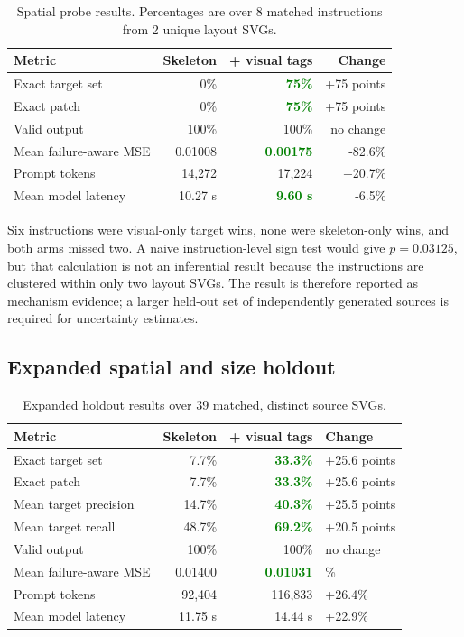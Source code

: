 \documentclass[10pt,a4paper]{article}
\newcommand{\good}[1]{\textcolor{green}{\textbf{#1}}}
\begin{document}
\begin{table}[H]
\centering
\caption{Spatial probe results. Percentages are over 8 matched instructions
from 2 unique layout SVGs.}
\begin{tabular}{@{}lR@{\hspace{4mm}}R@{\hspace{4mm}}R@{}}
\toprule
\textbf{Metric} & \textbf{Skeleton} & \textbf{+ visual tags} & \textbf{Change}\\
\midrule
Exact target set & 0\% & \good{75\%} & +75 points\\
Exact patch & 0\% & \good{75\%} & +75 points\\
Valid output & 100\% & 100\% & no change\\
Mean failure-aware MSE & 0.01008 & \good{0.00175} & -82.6\%\\
Prompt tokens & 14,272 & 17,224 & +20.7\%\\
Mean model latency & 10.27 s & \good{9.60 s} & -6.5\%\\
\bottomrule
\end{tabular}
\end{table}

Six instructions were visual-only target wins, none were skeleton-only wins,
and both arms missed two. A naive instruction-level sign test would give
\(p=0.03125\), but that calculation is not an inferential result because the
instructions are clustered within only two layout SVGs. The result is therefore
reported as mechanism evidence; a larger held-out set of independently
generated sources is required for uncertainty estimates.

\subsection{Expanded spatial and size holdout}

\begin{table}[H]
\centering
\caption{Expanded holdout results over 39 matched, distinct source SVGs.}
\begin{tabular}{@{}lrr>{\raggedleft\arraybackslash}p{24mm}@{}}
\toprule
\textbf{Metric} & \textbf{Skeleton} & \textbf{+ visual tags} & \textbf{Change}\\
\midrule
Exact target set & 7.7\% & \good{33.3\%} & +25.6 points\\
Exact patch & 7.7\% & \good{33.3\%} & +25.6 points\\
Mean target precision & 14.7\% & \good{40.3\%} & +25.5 points\\
Mean target recall & 48.7\% & \good{69.2\%} & +20.5 points\\
Valid output & 100\% & 100\% & no change\\
Mean failure-aware MSE & 0.01400 & \good{0.01031} & -26.4\%\\
Prompt tokens & 92,404 & 116,833 & +26.4\%\\
Mean model latency & 11.75 s & 14.44 s & +22.9\%\\
\bottomrule
\end{tabular}
\end{table}
\end{document}
